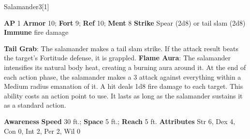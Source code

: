 \begin{monsection}{Salamander}{3}[1]
\vspace{-1em}\vspace{-1em}
\begin{spellcontent}
\begin{spelltargetinginfo}
{\textbf{AP} 1}
\pari \textbf{Armor} 10;
\textbf{Fort} 9;
\textbf{Ref} 10;
\textbf{Ment} 8
\pari \textbf{Strike} Spear  (2d8) or tail slam  (2d8)
\pari \textbf{Immune} fire damage
\end{spelltargetinginfo}
\begin{spelleffects}
\pari
\textbf{Tail Grab}:
The salamander makes a tail slam strike.
If the attack result beats the target's Fortitude defense, it is grappled.
\vspace{0.5em}
\pari
\textbf{Flame Aura}:
The salamander intensifies its natural body heat, creating a burning aura around it.
At the end of each action phase, the salamander makes a 3 attack
against everything within a Medium radius emanation of it.
A hit deals 1d8 fire damage to each target.
This ability costs an action point to use.
It lasts as long as the salamander sustains it as a standard action.
\end{spelleffects}
\end{spellcontent}
\begin{spellsubcontent}
\begin{spellfooter}
\pari \textbf{Awareness} 
\pari \textbf{Speed} 30 ft.;
\textbf{Space} 5 ft.;
\textbf{Reach} 5 ft.
\pari \textbf{Attributes}
Str 6,
Dex 4,
Con 0,
Int 2,
Per 2,
Wil 0
\end{spellfooter}
\end{spellsubcontent}
\end{monsection}
